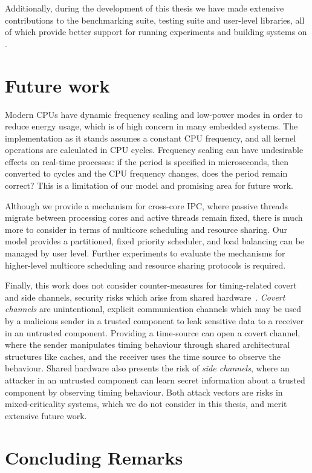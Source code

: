 Additionally, during the development of this thesis we have made extensive contributions to the 
\selfour benchmarking suite, testing suite and user-level libraries, all of which provide better 
support for running experiments and building systems on \selfour. 

\section{Future work}

Modern \glspl{CPU} have dynamic frequency scaling and low-power modes in order to reduce energy usage, which
is of high concern in many embedded systems. The implementation as it stands assumes a constant
\gls{CPU} frequency, and all kernel operations are calculated in \gls{CPU} cycles. Frequency scaling
can have undesirable effects on real-time processes: if the period is specified in microseconds, then
converted to cycles and the CPU frequency changes, does the period remain correct? This is a
limitation of our model and promising area for future work.

Although we provide a mechanism for cross-core IPC, where passive threads migrate between processing
cores and active threads remain fixed, there is much more to consider in terms of multicore
scheduling and resource sharing. Our model provides a partitioned, fixed priority scheduler, and 
load balancing can be managed by user level. Further experiments to evaluate the mechanisms for higher-level
multicore scheduling and resource sharing protocols is required. 

Finally, this work does not consider counter-measures for timing-related covert and side channels,
security risks which arise from
shared hardware~\citep{Ge_YCH_18}. \emph{Covert channels} are unintentional, explicit communication
channels which may be used by a malicious sender in a trusted component to leak sensitive data to a receiver
in an untrusted component. Providing a time-source can open a covert channel, where the sender
manipulates timing behaviour through shared architectural structures like caches, and the receiver
uses the time source to observe the behaviour. Shared hardware also presents the risk of
\emph{side channels}, 
where an attacker in an untrusted
component can learn secret information about a trusted component by observing timing behaviour. 
Both attack vectors are risks in mixed-criticality systems, which we do not consider in this
thesis, and merit extensive future work. 

\section{Concluding Remarks}


